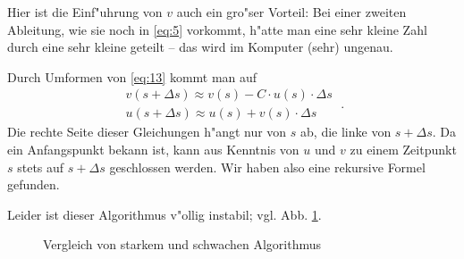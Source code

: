 \documentclass[a4paper]{book}
\begin{document}
Hier ist die Einf"uhrung von $v$ auch ein gro"ser Vorteil: Bei einer
zweiten Ableitung, wie sie noch in \eqref{eq:5} vorkommt, h"atte man
eine sehr kleine Zahl durch eine sehr kleine geteilt -- das wird im
Komputer (sehr) ungenau.

Durch Umformen von \eqref{eq:13} kommt man auf
\begin{equation}
  \label{eq:14}
  \begin{aligned}
      v(s+\Delta s) \approx v(s) - C \cdot u(s) \cdot \Delta s \\
      u(s + \Delta s) \approx u(s) + v(s) \cdot \Delta s
  \end{aligned} \;.
\tag{1.25}
\end{equation}
Die rechte Seite dieser Gleichungen h"angt nur von $s$ ab, die linke
von $s+\Delta s$. Da ein Anfangspunkt bekann ist, kann aus Kenntnis
von $u$ und $v$ zu einem Zeitpunkt $s$ stets auf $s+\Delta s$
geschlossen werden. Wir haben also eine rekursive Formel gefunden.

Leider ist dieser Algorithmus v"ollig instabil;
vgl. Abb. \ref{fig:vergleich_harmon_strong_weak}.


\begin{figure}
  \centering
{}
  \caption{Vergleich von starkem und schwachen Algorithmus}
  \label{fig:vergleich_harmon_strong_weak}
\end{figure}
\end{document}
